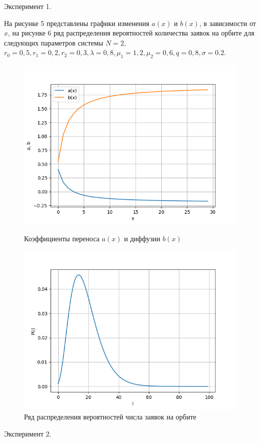 Эксперимент 1.

На рисунке 5 представлены графики изменения $a(x)$ и $b(x)$, в зависимости от $x$, на рисунке 6 ряд распределения вероятностей количества заявок на орбите для следующих параметров системы $N=2$, $r_{0}=0,5, r_{1}=0,2, r_{2}=0,3, \lambda=0,8, \mu_{1}=1,2, \mu_{2}=0,6 , q=0,8, \sigma=0.2.$

\begin{figure}[H]
	\centering
	\begin{minipage}[h]{0.49\linewidth}
		\includegraphics[width=0.8\linewidth]{ab2} 	
		\caption{Коэффициенты переноса $a(x)$ и диффузии $b(x)$}
		\label{ris:experimoriginal}
	\end{minipage}
	\hfill
	\begin{minipage}[h]{0.49\linewidth}
		\includegraphics[width=0.8\linewidth]{P2} 
		\caption{Ряд распределения вероятностей числа заявок на орбите}
		\label{ris:experimcoded}
	\end{minipage}
\end{figure}
\noindent Эксперимент 2.

